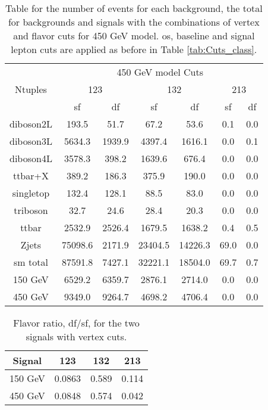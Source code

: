 \documentclass[a4paper, american, 12pt]{report}
\begin{document}
	\begin{table}[htb!]
		\centering
		\begin{tabular}{ |c|c|c|c|c|c|c| }
			\hline
			\multirow{3}{*}{Ntuples} & \multicolumn{6}{c|}{450 GeV model Cuts} \\
			\cline{2-7} \rule{0pt}{13pt}
			& \multicolumn{2}{c}{123} & \multicolumn{2}{|c}{132} & \multicolumn{2}{|c|}{213} \\
			\cline{2-7} \rule{0pt}{13pt}
			& \acrshort{sf} & \acrshort{df} & \acrshort{sf} & \acrshort{df} & \acrshort{sf} & \acrshort{df} \\
			\hline \rule{0pt}{13pt}
			diboson2L & 193.5 & 51.7 & 67.2 & 53.6 & 0.1 & 0.0 \\
			\hline \rule{0pt}{13pt}
			diboson3L & 5634.3 & 1939.9 & 4397.4 & 1616.1 & 0.0 & 0.1 \\
			\hline \rule{0pt}{13pt}
			diboson4L & 3578.3 & 398.2 & 1639.6 & 676.4 & 0.0 & 0.0 \\
			\hline \rule{0pt}{13pt}
			ttbar+X & 389.2 & 186.3 & 375.9 & 190.0 & 0.0 & 0.0 \\
			\hline \rule{0pt}{13pt}
			singletop & 132.4 & 128.1 & 88.5 & 83.0 & 0.0 & 0.0 \\
			\hline \rule{0pt}{13pt}
			triboson & 32.7 & 24.6 & 28.4 & 20.3 & 0.0 & 0.0 \\
			\hline \rule{0pt}{13pt}
			ttbar & 2532.9 & 2526.4 & 1679.5 & 1638.2 & 0.4 & 0.5 \\
			\hline \rule{0pt}{13pt}
			Zjets & 75098.6 & 2171.9 & 23404.5 & 14226.3 & 69.0 & 0.0 \\
			\hline \rule{0pt}{13pt}
			\acrshort{sm} total & 87591.8 & 7427.1 & 32221.1 & 18504.0 & 69.7 & 0.7 \\
			\hline \rule{0pt}{13pt}
			150 GeV & 6529.2 & 6359.7 & 2876.1 & 2714.0 & 0.0 & 0.0 \\
			\hline \rule{0pt}{13pt}
			450 GeV & 9349.0 & 9264.7 & 4698.2 & 4706.4 & 0.0 & 0.0 \\
			\hline
		\end{tabular}	
		\caption[Number of events for signal regions for 450 GeV.]{Table for the number of events for each background, the total for backgrounds and signals with the combinations of vertex and flavor cuts for 450 GeV model. \acrshort{os}, baseline and signal lepton cuts are applied as before in Table \ref{tab:Cuts_class}.}
		\label{tab:SignalRegions_450}
	\end{table}
	\begin{table}[htb!]
		\centering
		\begin{tabular}{|c|c|c|c|}
			\hline
			Signal & 123 & 132 & 213 \\
			\hline \rule{0pt}{13pt}
			150 GeV & 0.0863 & 0.589 & 0.114 \\
			\hline \rule{0pt}{13pt}
			450 GeV & 0.0848 & 0.574 & 0.042 \\
			\hline
		\end{tabular}
	\caption[Flavor ratios for cuts.]{Flavor ratio, \acrshort{df}/\acrshort{sf}, for the two signals with vertex cuts. \label{tab:dfsf_ratio}}
	\end{table}
	
\end{document}
